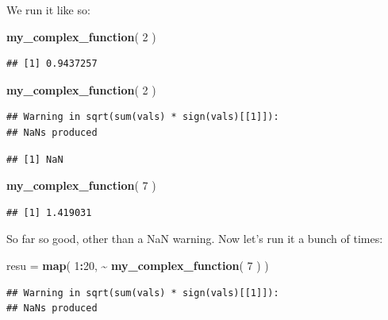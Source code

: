 \documentclass[
]{book}
\newenvironment{Shaded}{\begin{snugshade}}{\end{snugshade}}
\newcommand{\DecValTok}[1]{\textcolor[rgb]{0.00,0.00,0.81}{#1}}
\newcommand{\FunctionTok}[1]{\textcolor[rgb]{0.13,0.29,0.53}{\textbf{#1}}}
\newcommand{\NormalTok}[1]{#1}
\newcommand{\OtherTok}[1]{\textcolor[rgb]{0.56,0.35,0.01}{#1}}
\newcommand{\SpecialCharTok}[1]{\textcolor[rgb]{0.81,0.36,0.00}{\textbf{#1}}}
\begin{document}
We run it like so:

\begin{Shaded}
\begin{Highlighting}[]
\FunctionTok{my\_complex\_function}\NormalTok{( }\DecValTok{2}\NormalTok{ )}
\end{Highlighting}
\end{Shaded}

\begin{verbatim}
## [1] 0.9437257
\end{verbatim}

\begin{Shaded}
\begin{Highlighting}[]
\FunctionTok{my\_complex\_function}\NormalTok{( }\DecValTok{2}\NormalTok{ )}
\end{Highlighting}
\end{Shaded}

\begin{verbatim}
## Warning in sqrt(sum(vals) * sign(vals)[[1]]):
## NaNs produced
\end{verbatim}

\begin{verbatim}
## [1] NaN
\end{verbatim}

\begin{Shaded}
\begin{Highlighting}[]
\FunctionTok{my\_complex\_function}\NormalTok{( }\DecValTok{7}\NormalTok{ )}
\end{Highlighting}
\end{Shaded}

\begin{verbatim}
## [1] 1.419031
\end{verbatim}

So far so good, other than a NaN warning. Now let's run it a bunch of times:

\begin{Shaded}
\begin{Highlighting}[]
\NormalTok{resu }\OtherTok{=} \FunctionTok{map}\NormalTok{( }\DecValTok{1}\SpecialCharTok{:}\DecValTok{20}\NormalTok{, }\SpecialCharTok{\textasciitilde{}} \FunctionTok{my\_complex\_function}\NormalTok{( }\DecValTok{7}\NormalTok{ ) )}
\end{Highlighting}
\end{Shaded}

\begin{verbatim}
## Warning in sqrt(sum(vals) * sign(vals)[[1]]):
## NaNs produced
\end{verbatim}
\end{document}

